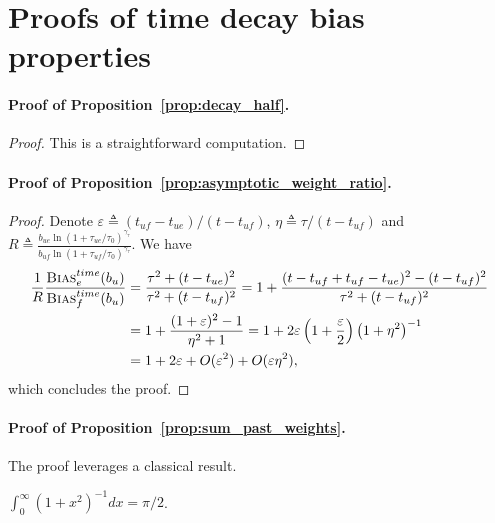 \section{Proofs of time decay bias properties}
\label{app:decay}

\paragraph{Proof of Proposition~\ref{prop:decay_half}.}

\begin{proof}
    This is a straightforward computation.
\end{proof}

\paragraph{Proof of Proposition~\ref{prop:asymptotic_weight_ratio}.}

\begin{proof}
    Denote $\varepsilon \triangleq (t_{uf} - t_{ue}) / (t - t_{uf})$,
    $\eta \triangleq \tau / (t - t_{uf})$
    and $R \triangleq \frac{
        b_{ue} \ln (1+\tau_{ue} / \tau_0)^{\gamma_\tau}
    }{
        b_{uf} \ln (1+\tau_{uf} / \tau_0)^{\gamma_\tau}
    }$.
    We have
    \begin{align}
        \frac{1}{R} \frac{\textsc{Bias}^{time}_e (b_u)}{\textsc{Bias}^{time}_f (b_u)}
        &= \frac{
            \tau^2 + (t-t_{ue})^2
        }{
            \tau^2 + (t-t_{uf})^2
        } 
        = 1 + \frac{
            (t-t_{uf} + t_{uf} - t_{ue})^2 - (t-t_{uf})^2
        }{
            \tau^2 + (t-t_{uf})^2
        } \\
        &= 1 + \frac{
            (1 + \varepsilon)^2 - 1
        }{
            \eta^2 + 1
        }
        = 1 + 2 \varepsilon 
            \left( 1 + \frac{\varepsilon}{2} \right) 
            \left( 1 + \eta^2 \right)^{-1} \\
        &= 1 + 2 \varepsilon 
            + O(\varepsilon^2) + O(\varepsilon \eta^2),
    \end{align}
    which concludes the proof.
\end{proof}


\paragraph{Proof of Proposition~\ref{prop:sum_past_weights}.}
The proof leverages a classical result.

\begin{lemma}
    \label{lemma:integral}
    $\int_0^\infty (1+x^2)^{-1} dx = \pi / 2$.
\end{lemma}

